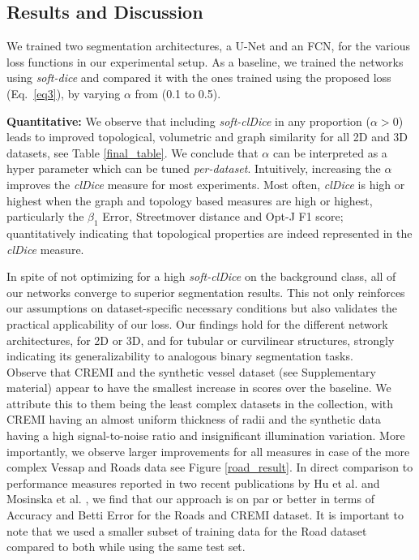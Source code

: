 \subsection{Results and Discussion}
We trained two segmentation architectures, a U-Net and an FCN, for the various loss functions in our experimental setup. As a baseline, we trained the networks using \textit{soft-dice} and compared it with the ones trained using the proposed loss (Eq.~\ref{eq3}), by varying $\alpha$ from (0.1 to 0.5).
\vspace{0.15cm}

\noindent\textbf{Quantitative:} We observe that including \textit{soft-clDice} in any  proportion ($\alpha>0$) leads to improved topological, volumetric and graph similarity for all 2D and 3D datasets, see Table \ref{final_table}. We conclude that $\alpha$ can be interpreted as a hyper parameter which can be tuned \emph{per-dataset}. Intuitively, increasing the  $\alpha$ improves the \textit{clDice} measure for most experiments. Most often, \textit{clDice} is high or highest when the graph and topology based measures are high or highest, particularly the $\beta_1$ Error,  Streetmover distance and  Opt-J F1 score; quantitatively indicating that topological properties are indeed represented in the \textit{clDice} measure.

In spite of not optimizing for a high \textit{soft-clDice} on the background class, all of our networks converge to superior segmentation results. This not only reinforces our assumptions on dataset-specific necessary conditions but also validates the practical applicability of our loss. 
Our findings hold for the different network architectures, for 2D or 3D, and for tubular or curvilinear structures, strongly indicating its generalizability to analogous binary segmentation tasks.\\

Observe that CREMI and the synthetic vessel dataset (see Supplementary material) appear to have the smallest increase in scores over the baseline. We attribute this to them being the least complex datasets in the collection, with CREMI having an almost uniform thickness of radii and the synthetic data having a high signal-to-noise ratio and insignificant illumination variation. 
More importantly, we observe larger improvements for all measures in case of the more complex Vessap and Roads data see Figure \ref{road_result}.
In direct comparison to performance measures reported in two recent publications by Hu et al. and Mosinska et al. \cite{hu2019topology,mosinska2018beyond}, we find that our approach is on par or better in terms of Accuracy and Betti Error for the Roads and CREMI dataset. It is important to note that we used a smaller subset of training data for the Road dataset compared to both while using the same test set. 

